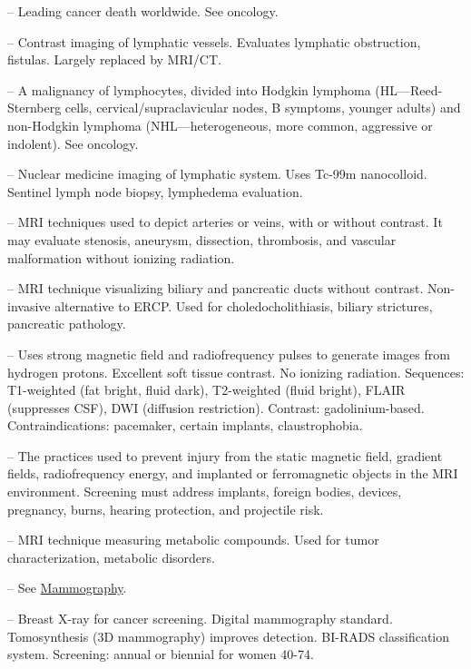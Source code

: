 -- Leading cancer death worldwide. See oncology.

-- Contrast imaging of lymphatic vessels. Evaluates lymphatic obstruction, fistulas. Largely replaced by MRI/CT.

-- A malignancy of lymphocytes, divided into Hodgkin lymphoma (HL—Reed-Sternberg cells, cervical/supraclavicular nodes, B symptoms, younger adults) and non-Hodgkin lymphoma (NHL—heterogeneous, more common, aggressive or indolent). See oncology.

-- Nuclear medicine imaging of lymphatic system. Uses Tc-99m nanocolloid. Sentinel lymph node biopsy, lymphedema evaluation.

-- MRI techniques used to depict arteries or veins, with or without contrast. It may evaluate stenosis, aneurysm, dissection, thrombosis, and vascular malformation without ionizing radiation.

-- MRI technique visualizing biliary and pancreatic ducts without contrast. Non-invasive alternative to ERCP. Used for choledocholithiasis, biliary strictures, pancreatic pathology.

-- Uses strong magnetic field and radiofrequency pulses to generate images from hydrogen protons. Excellent soft tissue contrast. No ionizing radiation. Sequences: T1-weighted (fat bright, fluid dark), T2-weighted (fluid bright), FLAIR (suppresses CSF), DWI (diffusion restriction). Contrast: gadolinium-based. Contraindications: pacemaker, certain implants, claustrophobia.

-- The practices used to prevent injury from the static magnetic field, gradient fields, radiofrequency energy, and implanted or ferromagnetic objects in the MRI environment. Screening must address implants, foreign bodies, devices, pregnancy, burns, hearing protection, and projectile risk.

-- MRI technique measuring metabolic compounds. Used for tumor characterization, metabolic disorders.

-- See \hyperlink{Mammography}{Mammography}.

-- Breast X-ray for cancer screening. Digital mammography standard. Tomosynthesis (3D mammography) improves detection. BI-RADS classification system. Screening: annual or biennial for women 40-74.

